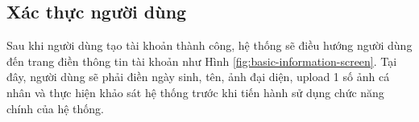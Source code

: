 \subsection{Xác thực người dùng}




Sau khi người dùng tạo tài khoản thành công, hệ thống sẽ điều hướng người dùng đến trang điền thông tin tài khoản như Hình \ref{fig:basic-information-screen}. Tại đây, người dùng sẽ phải điền ngày sinh, tên, ảnh đại diện, upload 1 số ảnh cá nhân và thực hiện khảo sát hệ thống trước khi tiến hành sử dụng chức năng chính của hệ thống.

